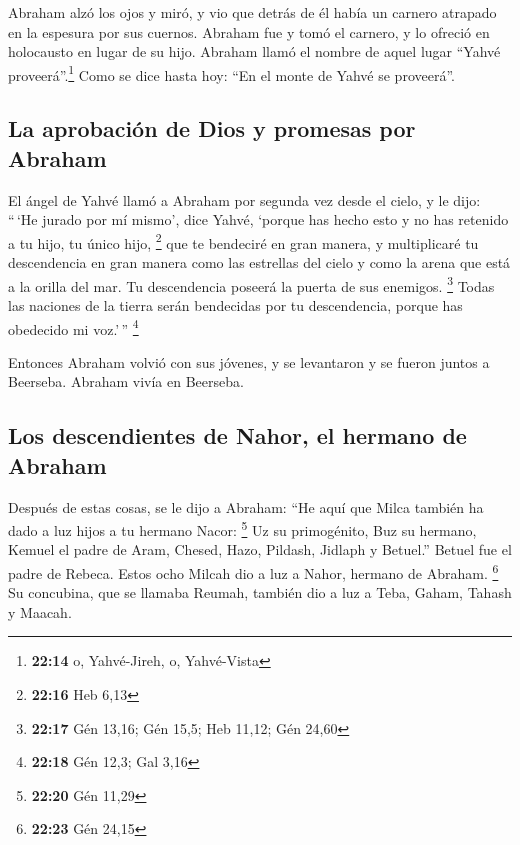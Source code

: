 \begin{paracol}{2}
 Abraham alzó los ojos y miró, y vio que detrás de él
había un carnero atrapado en la espesura por sus cuernos. Abraham fue y
tomó el carnero, y lo ofreció en holocausto en lugar de su hijo.
 Abraham llamó el nombre de aquel lugar ``Yahvé
proveerá''.\footnote{\textbf{22:14} o, Yahvé-Jireh, o, Yahvé-Vista} Como
se dice hasta hoy: ``En el monte de Yahvé se proveerá''.

\hypertarget{la-aprobaciuxf3n-de-dios-y-promesas-por-abraham}{%
\subsection{La aprobación de Dios y promesas por
Abraham}\label{la-aprobaciuxf3n-de-dios-y-promesas-por-abraham}}

 El ángel de Yahvé llamó a Abraham por segunda vez desde
el cielo,  y le dijo: ``\,`He jurado por mí mismo', dice
Yahvé, `porque has hecho esto y no has retenido a tu hijo, tu único
hijo, \footnote{\textbf{22:16} Heb 6,13}  que te
bendeciré en gran manera, y multiplicaré tu descendencia en gran manera
como las estrellas del cielo y como la arena que está a la orilla del
mar. Tu descendencia poseerá la puerta de sus enemigos. \footnote{\textbf{22:17}
  Gén 13,16; Gén 15,5; Heb 11,12; Gén 24,60}  Todas las
naciones de la tierra serán bendecidas por tu descendencia, porque has
obedecido mi voz.'\,'' \footnote{\textbf{22:18} Gén 12,3; Gal 3,16}

 Entonces Abraham volvió con sus jóvenes, y se levantaron
y se fueron juntos a Beerseba. Abraham vivía en Beerseba.

\hypertarget{los-descendientes-de-nahor-el-hermano-de-abraham}{%
\subsection{Los descendientes de Nahor, el hermano de
Abraham}\label{los-descendientes-de-nahor-el-hermano-de-abraham}}

 Después de estas cosas, se le dijo a Abraham: ``He aquí
que Milca también ha dado a luz hijos a tu hermano Nacor: \footnote{\textbf{22:20}
  Gén 11,29}  Uz su primogénito, Buz su hermano, Kemuel
el padre de Aram,  Chesed, Hazo, Pildash, Jidlaph y
Betuel.''  Betuel fue el padre de Rebeca. Estos ocho
Milcah dio a luz a Nahor, hermano de Abraham. \footnote{\textbf{22:23}
  Gén 24,15}  Su concubina, que se llamaba Reumah,
también dio a luz a Teba, Gaham, Tahash y Maacah.


\end{paracol}
